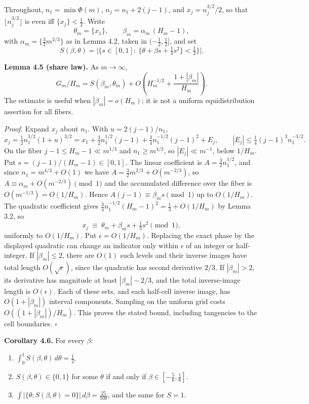 \documentclass[11pt,a4paper]{article}
\providecommand{\tightlist}{\setlength{\itemsep}{0pt}\setlength{\parskip}{0pt}}
\begin{document}
Throughout, \(n_1=\min\Phi(m)\), \(n_j=n_1+2(j-1)\), and
\(x_j=n_j^{3/2}/2\), so that \(\lfloor n_j^{3/2}\rfloor\) is even iff
\(\{x_j\}<\tfrac12\). Write \[
\theta_m=\{x_1\},\qquad
\beta_m=\alpha_m\,(H_m-1),
\] with \(\alpha_m=\{\tfrac32m^{2/3}\}\) as in Lemma 4.2, taken in
\((-\tfrac12,\tfrac12]\), and set \[
S(\beta,\theta)
=\bigl|\{s\in[0,1]:\ \{\theta+\beta s+\tfrac13s^2\}<\tfrac12\}\bigr|.
\]

\textbf{Lemma 4.5 (share law).} As \(m\to\infty\), \[
G_m/H_m=S(\beta_m,\theta_m)
 +O\left(H_m^{-1/2}+\frac{1+|\beta_m|}{H_m}\right).
\] The estimate is useful when \(|\beta_m|=o(H_m)\); it is not a uniform
equidistribution assertion for all fibers.

\emph{Proof.} Expand \(x_j\) about \(n_1\). With \(u=2(j-1)/n_1\), \[
x_j=\tfrac12n_1^{3/2}(1+u)^{3/2}
=x_1+\tfrac32n_1^{1/2}(j-1)+\tfrac34n_1^{-1/2}(j-1)^2+E_j,
\qquad |E_j|\le\tfrac14(j-1)^3n_1^{-3/2}.
\] On the fiber \(j-1\le H_m-1\ll m^{1/3}\) and \(n_1\ge m^{4/3}\), so
\(|E_j|\ll m^{-1}\), below \(1/H_m\). Put \(s=(j-1)/(H_m-1)\in[0,1]\).
The linear coefficient is \(A=\tfrac32n_1^{1/2}\), and since
\(n_1=m^{4/3}+O(1)\) we have \(A=\tfrac32m^{2/3}+O(m^{-2/3})\), so
\(A\equiv\alpha_m+O(m^{-2/3})\pmod1\) and the accumulated difference
over the fiber is \(O(m^{-1/3})=O(1/H_m)\). Hence
\(A(j-1)\equiv\beta_ms\pmod 1\) up to \(O(1/H_m)\). The quadratic
coefficient gives \(\tfrac34n_1^{-1/2}(H_m-1)^2=\tfrac13+O(1/H_m)\) by
Lemma 3.2, so \[
x_j\ \equiv\ \theta_m+\beta_ms+\tfrac13s^2\pmod 1,
\] uniformly to \(O(1/H_m)\). Put \(\epsilon=O(1/H_m)\). Replacing the
exact phase by the displayed quadratic can change an indicator only
within \(\epsilon\) of an integer or half-integer. If \(|\beta_m|\le2\),
there are \(O(1)\) such levels and their inverse images have total
length \(O(\sqrt\epsilon)\), since the quadratic has second derivative
\(2/3\). If \(|\beta_m|>2\), its derivative has magnitude at least
\(|\beta_m|-2/3\), and the total inverse-image length is
\(O(\epsilon)\). Each of these sets, and each half-cell inverse image,
has \(O(1+|\beta_m|)\) interval components. Sampling on the uniform grid
costs \(O((1+|\beta_m|)/H_m)\). This proves the stated bound, including
tangencies to the cell boundaries. \(\square\)

\textbf{Corollary 4.6.} For every \(\beta\):

\begin{enumerate}
\def\labelenumi{\arabic{enumi}.}
\tightlist
\item
  \(\int_0^1S(\beta,\theta)\,d\theta=\tfrac12\).
\item
  \(S(\beta,\theta)\in\{0,1\}\) for some \(\theta\) if and only if
  \(\beta\in[-\tfrac56,\tfrac16]\).
\item
  \(\displaystyle\int\bigl|\{\theta:S(\beta,\theta)=0\}\bigr|\,d\beta=\tfrac{25}{108}\),
  and the same for \(S=1\).
\end{enumerate}
\end{document}
